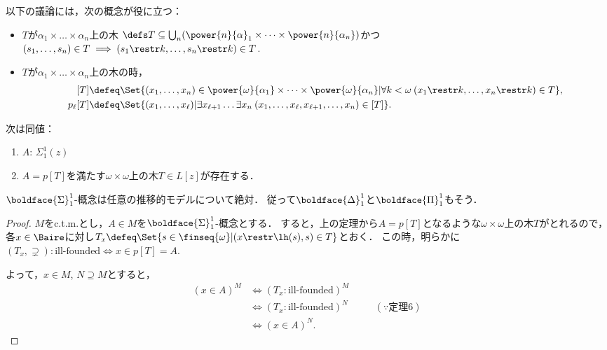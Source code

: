 \documentclass[a4j]{ltjsarticle}
\begin{document}
以下の議論には，次の概念が役に立つ：

\begin{definition}
 \begin{itemize}
  \item $T$が$\alpha_1 \times \dots \times \alpha_n$上の木
        $\defs T \subseteq \bigcup_n (\power{n}{\alpha}_1 \times \dots \times \power{n}{\alpha_n})$かつ$(s_1, \dots, s_n) \in T \implies (s_1 \restr k, \dots, s_n \restr k) \in T$.
  \item $T$が$\alpha_1 \times \dots \times \alpha_n$上の木の時，
        \begin{align*}\phantom{}
         [T] &\defeq \Set{(x_1, \dots, x_n) \in \power{\omega}{\alpha_1} \times \dots \times \power{\omega}{\alpha_n} | \forall k < \omega \: (x_1 \restr k, \dots, x_n \restr k) \in T},\\
         p_\ell[T] &\defeq \Set{ (x_1, \dots, x_\ell) | \exists x_{\ell+1}\dots \exists x_{n}\: (x_1, \dots, x_{\ell}, x_{\ell+1}, \dots, x_n) \in [T] }.
        \end{align*}
 \end{itemize}
\end{definition}

\begin{theorem}
 次は同値：
 \begin{enumerate}
  \item $A$: $\Sigma^1_1(z)$
  \item $A = p[T]$を満たす$\omega\times\omega$上の木$T \in L[z]$が存在する．
 \end{enumerate}
\end{theorem}

\begin{theorem}
 $\boldface{\Sigma}^1_1$-概念は任意の推移的モデルについて絶対．
 従って$\boldface{\Delta}^1_1$と$\boldface{\Pi}^1_1$もそう．
\end{theorem}

\begin{proof}
 $M$をc.t.m.とし，$A \in M$を$\boldface{\Sigma}^1_1$-概念とする．
 すると，上の定理から$A = p[T]$となるような$\omega \times \omega$上の木$T$がとれるので，
 各$x \in \Baire$に対し$T_x \defeq \Set{s \in \finseq{\omega} | (x \restr \lh(s), s) \in T}$とおく．
 この時，明らかに$(T_x, \supsetneq): \text{ill-founded} \iff x \in p[T] = A$.
 
 よって，$x \in M$, $N \supseteq M$とすると，
 \begin{align*}
  (x \in A)^{M} &\iff (T_x: \text{ill-founded})^M\\
  &\iff (T_x: \text{ill-founded})^N &\quad& (\because \text{定理}6)\\
  &\iff (x \in A)^N.
 \end{align*}
\end{proof}
\end{document}
